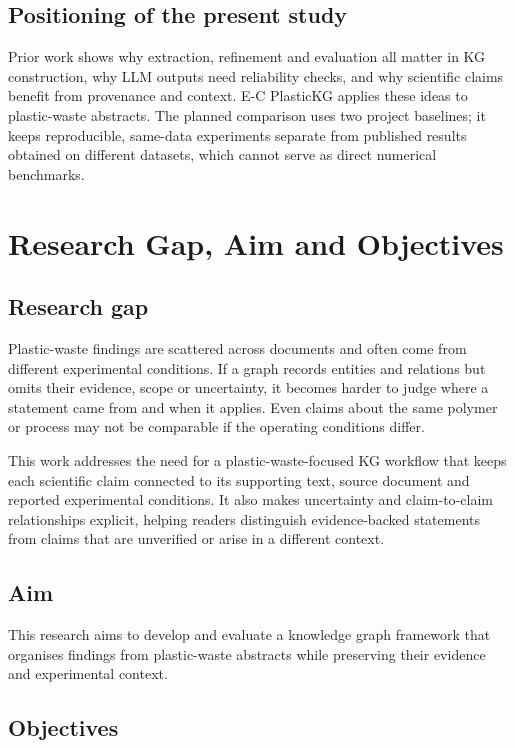 \documentclass[11pt,a4paper]{article}
\begin{document}
\subsection{Positioning of the present study}

Prior work shows why extraction, refinement and evaluation all matter in KG construction, why LLM outputs need reliability checks, and why scientific claims benefit from provenance and context. E-C PlasticKG applies these ideas to plastic-waste abstracts. The planned comparison uses two project baselines; it keeps reproducible, same-data experiments separate from published results obtained on different datasets, which cannot serve as direct numerical benchmarks.

\section{Research Gap, Aim and Objectives}

\subsection{Research gap}

Plastic-waste findings are scattered across documents and often come from different experimental conditions. If a graph records entities and relations but omits their evidence, scope or uncertainty, it becomes harder to judge where a statement came from and when it applies. Even claims about the same polymer or process may not be comparable if the operating conditions differ.

This work addresses the need for a plastic-waste-focused KG workflow that keeps each scientific claim connected to its supporting text, source document and reported experimental conditions. It also makes uncertainty and claim-to-claim relationships explicit, helping readers distinguish evidence-backed statements from claims that are unverified or arise in a different context.

\subsection{Aim}

This research aims to develop and evaluate a knowledge graph framework that organises findings from plastic-waste abstracts while preserving their evidence and experimental context.

\subsection{Objectives}
\end{document}
